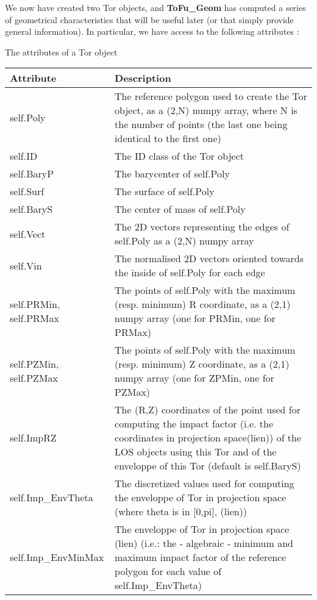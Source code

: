 \documentclass[letterpaper,10pt,english]{sphinxmanual}
\begin{document}
We now have created two Tor objects, and \textbf{ToFu\_Geom} has computed a series of geometrical characteristics that will be useful later (or that simply provide general information).
In particular, we have access to the following attributes :


\begin{threeparttable}
\capstart\caption{The attributes of a Tor object}

\begin{tabulary}{\linewidth}{|L|L|}
\hline
\textbf{
Attribute
} & \textbf{
Description
}\\\hline

self.Poly
 & 
The reference polygon used to create the Tor object, as a (2,N) numpy array, where N is the number of points (the last one being identical to the first one)
\\\hline

self.ID
 & 
The ID class of the Tor object
\\\hline

self.BaryP
 & 
The barycenter of self.Poly
\\\hline

self.Surf
 & 
The surface of self.Poly
\\\hline

self.BaryS
 & 
The center of mass of self.Poly
\\\hline

self.Vect
 & 
The 2D vectors representing the edges of self.Poly as a (2,N) numpy array
\\\hline

self.Vin
 & 
The normalised 2D vectors oriented towards the inside of self.Poly for each edge
\\\hline

self.PRMin, self.PRMax
 & 
The points of self.Poly with the maximum (resp. minimum) R coordinate, as a (2,1) numpy array (one for PRMin, one for PRMax)
\\\hline

self.PZMin, self.PZMax
 & 
The points of self.Poly with the maximum (resp. minimum) Z coordinate, as a (2,1) numpy array (one for ZPMin, one for PZMax)
\\\hline

self.ImpRZ
 & 
The (R,Z) coordinates of the point used for computing the impact factor (i.e. the coordinates in projection space(lien)) of the LOS objects using this Tor and of the enveloppe of this Tor (default is self.BaryS)
\\\hline

self.Imp\_EnvTheta
 & 
The discretized values used for computing the enveloppe of Tor in projection space (where theta is in {[}0,pi{]}, (lien))
\\\hline

self.Imp\_EnvMinMax
 & 
The enveloppe of Tor in projection space (lien) (i.e.: the - algebraic - minimum and maximum impact factor of the reference polygon for each value of self.Imp\_EnvTheta)
\\\hline
\end{tabulary}

\end{threeparttable}
\end{document}
